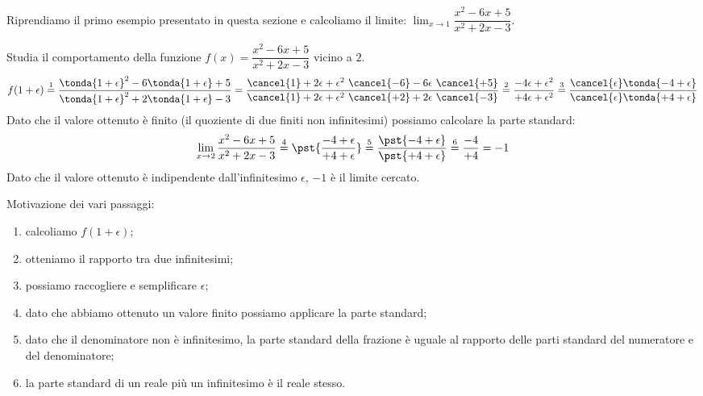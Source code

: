 \begin{esempio}
Riprendiamo il primo esempio presentato in questa sezione e calcoliamo il 
limite: \(\displaystyle \lim_{x \to 1}\dfrac{x^2-6x+5}{x^2+2x-3}\).

Studia il comportamento della funzione 
\(f(x) = \dfrac{x^2-6x+5}{x^2+2x-3}\)
vicino a \(2\). 
\[
f(1 + \epsilon) \stackrel{1}{=}
  \dfrac{\tonda{1+\epsilon}^2-6\tonda{1+\epsilon}+5}
        {\tonda{1+\epsilon}^2+2\tonda{1+\epsilon}-3} =
  \dfrac{\cancel{1}+2\epsilon+\epsilon^2~
            \cancel{-6}-6\epsilon~\cancel{+5}}
        {\cancel{1}+2\epsilon+\epsilon^2~
            \cancel{+2}+2\epsilon~\cancel{-3}}
\stackrel{2}{=}
  \dfrac{-4\epsilon+\epsilon^2}
        {+4\epsilon+\epsilon^2}
\stackrel{3}{=}
  \dfrac{\cancel{\epsilon}\tonda{-4+\epsilon}}
        {\cancel{\epsilon}\tonda{+4+\epsilon}}
\]
Dato che il valore ottenuto è finito 
(il quoziente di due finiti non infinitesimi) 
possiamo calcolare la parte standard:
\[
\lim_{x \to 2} \frac{x^2-6x+5}{x^2+2x-3} \stackrel{4}{=} 
\pst{\frac{-4+\epsilon} {+4+\epsilon}} \stackrel{5}{=}
\frac{\pst{-4+\epsilon}}{\pst{+4+\epsilon}} \stackrel{6}{=} 
\frac{-4}{+4} = -1
\]
Dato che il valore ottenuto è indipendente dall'infinitesimo \(\epsilon\), 
\(-1\) è il limite cercato.

Motivazione dei vari passaggi:
\begin{enumerate} [nosep]
\item calcoliamo \(f(1+\epsilon)\);
\item otteniamo il rapporto tra due infinitesimi;
\item possiamo raccogliere e semplificare \(\epsilon\);
\item dato che abbiamo ottenuto un valore finito possiamo applicare la parte 
standard;
\item dato che il denominatore non è infinitesimo, la parte standard della 
frazione è uguale al rapporto delle parti standard del numeratore e del 
denominatore;
\item la parte standard di un reale più un infinitesimo è il reale stesso.
\end{enumerate}
\end{esempio}


